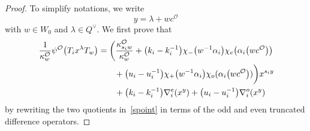 \documentclass[pdftex]{sigma}
\numberwithin{equation}{section}
\begin{document}
\begin{proof}
To simplify notations, we write
\[
y=\lambda+wc^\mathcal{O}
\]
with $w\in W_0$ and $\lambda\in Q^\vee$.
We first prove that
\begin{gather}
\frac{1}{\kappa_w^\mathcal{O}} \psi^\mathcal{O}\bigl(T_ix^\lambda T_w\bigr)
=\biggl(\frac{\kappa_{s_iw}^\mathcal{O}}{\kappa_w^\mathcal{O}}
+\bigl(k_i-k_i^{-1}\bigr)\chi_-\bigl(w^{-1}\alpha_i\bigr)\chi_e\bigl(\alpha_i\bigl(wc^\mathcal{O}\bigr)\bigr)\nonumber\\
\hphantom{\frac{1}{\kappa_w^\mathcal{O}} \psi^\mathcal{O}\bigl(T_ix^\lambda T_w\bigr)=\biggl(}{}
 +\bigl(u_i-u_i^{-1}\bigr)\chi_+\bigl(w^{-1}\alpha_i\bigr)\chi_o(\alpha_i\bigl(wc^\mathcal{O}\bigr))\biggr)x^{s_iy}\nonumber\\
 \hphantom{\frac{1}{\kappa_w^\mathcal{O}} \psi^\mathcal{O}\bigl(T_ix^\lambda T_w\bigr)=}{}
 +\bigl(k_i-k_i^{-1}\bigr)\nabla_i^e(x^y)+\bigl(u_i-u_i^{-1}\bigr)\nabla_i^o(x^y)
\label{formula}
\end{gather}
by rewriting the two quotients in~\eqref{spoint} in terms of the odd and even truncated difference operators.


\end{proof}
\end{document}
